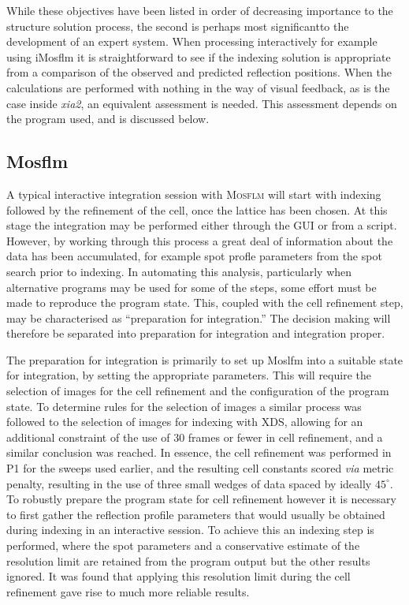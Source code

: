 \documentclass[a4paper, 11pt]{article}
\begin{document}
\noindent
While these objectives have been listed in order of decreasing
importance to the structure solution process, the second is perhaps
most significantto  the development of an expert system. When processing
interactively for example using iMosflm it is
straightforward to see if the indexing solution is appropriate from a
comparison of the observed and predicted reflection positions. When
the calculations are
performed with nothing in the way of visual feedback,
as is the case inside \emph{xia2}, an equivalent assessment is
needed. This assessment depends on the program used, and is
discussed below.

\subsection{Mosflm}

A typical interactive integration session with \textsc{Mosflm} will start with
indexing followed by the refinement of the cell, once the lattice has
been chosen. At this stage the integration may be performed either
through the GUI or from a script. However, by working through this
process a great deal of information about the data has been
accumulated, for example spot profle parameters from the spot search
prior to indexing. In automating this analysis, particularly when
alternative programs may be used for some of the steps, some effort
must be made to reproduce the program state. This, coupled with the
cell refinement step, may be characterised as ``preparation for
integration.'' The decision making will therefore be separated into
preparation for integration and integration proper.

The preparation for integration is primarily to set up Moslfm into
a suitable state for integration, by setting the appropriate
parameters. This will require the
selection of images for the cell refinement and
the configuration of the program state. To determine rules for the
selection of images a similar process was followed to the selection of
images for indexing with XDS, allowing for an additional constraint of
the use of 30 frames or fewer in cell refinement, and a similar
conclusion was reached. 
In essence, the cell refinement was performed in P1 for the
sweeps used earlier, and the resulting cell constants scored
\emph{via} metric penalty, resulting in the use of three small wedges
of data spaced by ideally $45^{\circ}$. To robustly prepare the program state
for cell refinement however it is necessary to first gather the
reflection profile parameters that would usually be obtained during
indexing in an interactive session. To achieve this an indexing step is
performed, where the spot parameters and a conservative
estimate of the resolution limit are retained from the program output
but the other results ignored. It was found that
applying this resolution limit during the cell refinement gave rise to
much more reliable results.
\end{document}
